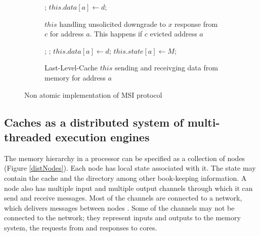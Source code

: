 \begin{figure}
\begin{subfigure}{\linewidth}
\begin{boxedminipage}{\linewidth}
\begin{algorithmic}
    \State \receive{} ;
    \State $this.data[a] \gets d$;
  \EndIf
\EndProc
\end{algorithmic}
\end{boxedminipage}
\caption{$this$ handling unsolicited downgrade to $x$ response from $c$ for
address $a$. This happens if $c$ evicted address $a$}
\label{dRespL1}
\end{subfigure}

\begin{subfigure}{\linewidth}
\begin{boxedminipage}{\linewidth}
\begin{algorithmic}
  \State \send{} ;
  \State \receive{} ;
  \State $this.data[a] \gets d$;
  \State $this.state[a] \gets M$;
\EndProc
\end{algorithmic}
\end{boxedminipage}
\caption{Last-Level-Cache $this$ sending and receivging data from memory for
address $a$}
\label{sendMem2}
\end{subfigure}

\caption{Non atomic implementation of MSI protocol}
\label{realistic}
\end{figure}

\subsection{Caches as a distributed system of multi-threaded execution engines}

The memory hierarchy in a processor can be specified as a collection of nodes
(Figure \ref{distNodes}). Each node has local state associated with it. The
state may contain the cache and the directory among other book-keeping
information. A node also has multiple input and multiple output channels
through which it can send and receive messages. Most of the channels are
connected to a network, which delivers messages between nodes
. Some of the channels may not be connected to the network; they represent
inputs and outputs to the memory system, \viz the requests from and responses to
cores.


